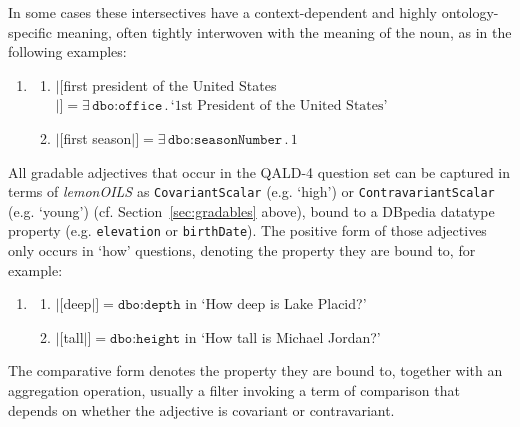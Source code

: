 \documentclass[11pt]{article}
\begin{document}
In some cases these intersectives have a context-dependent and highly ontology-specific meaning, 
often tightly interwoven with the meaning of the noun, as in the following examples:
\begin{enumerate}
\item \begin{enumerate}
\item $|[$first president of the United States$|]=\exists\,\texttt{dbo:office}\,.\,\text{`1st President of the United States'}$
\item $|[$first season$|]=\exists\,\texttt{dbo:seasonNumber}\,.\,1$
\end{enumerate}
\end{enumerate}

All gradable adjectives that occur in the QALD-4 question set can be captured in terms of \emph{lemonOILS} 
as \texttt{CovariantScalar} (e.g. `high') or \texttt{ContravariantScalar} (e.g. `young') (cf. Section~\ref{sec:gradables} above), 
bound to a DBpedia datatype property (e.g. \texttt{elevation} or \texttt{birthDate}). 
The positive form of those adjectives only occurs in `how' questions, denoting the property they are bound to, for example:
\begin{enumerate} 
\item \begin{enumerate}
 \item $|[$deep$|]=\texttt{dbo:depth}$ in `How deep is Lake Placid?'
 \item $|[$tall$|]=\texttt{dbo:height}$ in `How tall is Michael Jordan?'
 \end{enumerate}
\end{enumerate}
The comparative form denotes the property they are bound to, together with an aggregation operation, usually a filter 
invoking a term of comparison that depends on whether the adjective is covariant or contravariant.
\end{document}
